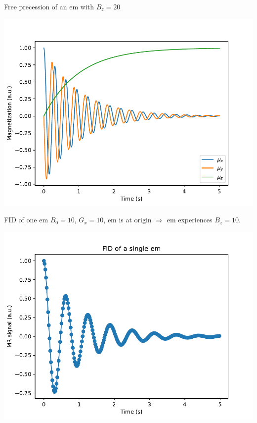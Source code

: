 \documentclass{beamer}
\begin{document}
\begin{frame}{Free precession of an em with $B_z = 20$}
\begin{center}
\includegraphics[height=0.8\textheight]{free_precession_em_two}
\end{center}
\end{frame}

\begin{frame}{FID of one em}
$B_0 = 10$, $G_x = 10$, em is at origin $\Rightarrow$ em experiences $B_z = 10$.
\begin{center}
\includegraphics[height=0.8\textheight]{fid_one_em}
\end{center}
\end{frame}
\end{document}
